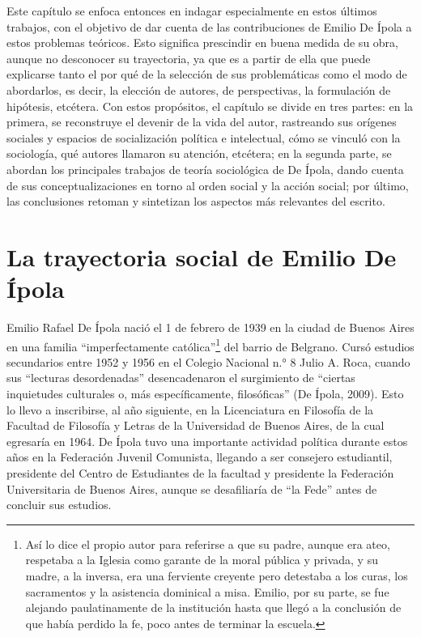 Este capítulo se enfoca entonces en indagar especialmente en estos últimos trabajos, con el objetivo de dar cuenta de las contribuciones de Emilio De Ípola a estos problemas teóricos. Esto significa prescindir en buena medida de su obra, aunque no desconocer su trayectoria, ya que es a partir de ella que puede explicarse tanto el por qué de la selección de sus problemáticas como el modo de abordarlos, es decir, la elección de autores, de perspectivas, la formulación de hipótesis, etcétera. Con estos propósitos, el capítulo se divide en tres partes: en la primera, se reconstruye el devenir de la vida del autor, rastreando sus orígenes sociales y espacios de socialización política e intelectual, cómo se vinculó con la sociología, qué autores llamaron su atención, etcétera; en la segunda parte, se abordan los principales trabajos de teoría sociológica de De Ípola, dando cuenta de sus conceptualizaciones en torno al orden social y la acción social; por último, las conclusiones retoman y sintetizan los aspectos más relevantes del escrito.

\section{La trayectoria social de Emilio De Ípola}

Emilio Rafael De Ípola nació el 1 de febrero de 1939 en la ciudad de Buenos Aires en una familia ``imperfectamente católica''\footnote{Así lo dice el propio autor para referirse a que su padre, aunque era ateo, respetaba a la Iglesia como garante de la moral pública y privada, y su madre, a la inversa, era una ferviente creyente pero detestaba a los curas, los sacramentos y la asistencia dominical a misa. Emilio, por su parte, se fue alejando paulatinamente de la institución hasta que llegó a la conclusión de que había perdido la fe, poco antes de terminar la escuela.} del barrio de Belgrano. Cursó estudios secundarios entre 1952 y 1956 en el Colegio Nacional n.° 8 Julio A. Roca, cuando sus ``lecturas desordenadas'' desencadenaron el surgimiento de ``ciertas inquietudes culturales o, más específicamente, filosóficas'' (De Ípola, 2009). Esto lo llevo a inscribirse, al año siguiente, en la Licenciatura en Filosofía de la Facultad de Filosofía y Letras de la Universidad de Buenos Aires, de la cual egresaría en 1964. De Ípola tuvo una importante actividad política durante estos años en la Federación Juvenil Comunista, llegando a ser consejero estudiantil, presidente del Centro de Estudiantes de la facultad y presidente la Federación Universitaria de Buenos Aires, aunque se desafiliaría de ``la Fede'' antes de concluir sus estudios.

